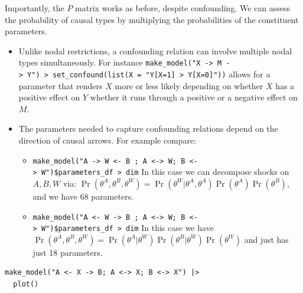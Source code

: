 \documentclass[
  article]{jss}
\providecommand{\tightlist}{%
  \setlength{\itemsep}{0pt}\setlength{\parskip}{0pt}}\usepackage{longtable,booktabs,array}
\begin{document}
Importantly, the \(P\) matrix works as before, despite confounding. We
can assess the probability of causal types by multiplying the
probabilities of the constituent parameters.

\begin{itemize}
\tightlist
\item
  Unlike nodal restrictions, a confounding relation can involve multiple
  nodal types simultaneously. For instance
  \texttt{make\_model("X\ -\textgreater{}\ M\ -\textgreater{}\ Y")\ \textbar{}\textgreater{}\ set\_confound(list(X\ =\ "Y{[}X=1{]}\ \textgreater{}\ Y{[}X=0{]}"))}
  allows for a parameter that renders \(X\) more or less likely
  depending on whether \(X\) has a positive effect on \(Y\) whether it
  runs through a positive or a negative effect on \(M\).
\item
  The parameters needed to capture confounding relations depend on the
  direction of causal arrows. For example compare:

  \begin{itemize}
  \tightlist
  \item
    \texttt{make\_model("A\ -\textgreater{}\ W\ \textless{}-\ B\ ;\ A\ \textless{}-\textgreater{}\ W;\ B\ \textless{}-\textgreater{}\ W")\$parameters\_df\ \textbar{}\textgreater{}\ dim}
    In this case we can decompose shocks on \(A, B, W\) via:
    \(\Pr(\theta^A, \theta^B, \theta^W) = \Pr(\theta^W | \theta^A, \theta^A)\Pr(\theta^A)\Pr(\theta^B)\),
    and we have 68 parameters.
  \item
    \texttt{make\_model("A\ \textless{}-\ W\ -\textgreater{}\ B\ ;\ A\ \textless{}-\textgreater{}\ W;\ B\ \textless{}-\textgreater{}\ W")\$parameters\_df\ \textbar{}\textgreater{}\ dim}
    In this case we have
    \(\Pr(\theta^A, \theta^B, \theta^W) = \Pr(\theta^A | \theta^W)\Pr(\theta^B|\theta^W)\Pr(\theta^W)\)
    and just has just 18 parameters.
  \end{itemize}
\end{itemize}

\begin{verbatim}
make_model("A <- X -> B; A <-> X; B <-> X") |> 
  plot()
\end{verbatim}
\end{document}
